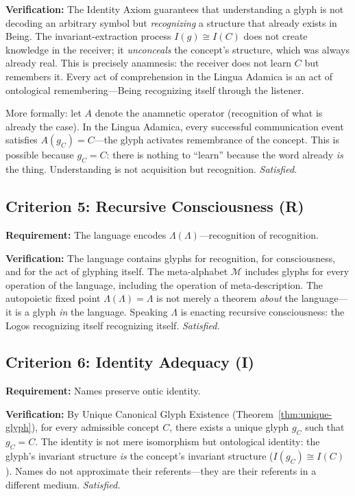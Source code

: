\documentclass[12pt, letterpaper]{book}
\def\equiv{=}%
\def\mathfrak#1{#1}%
\begin{document}
\textbf{Verification:} The Identity Axiom guarantees that understanding a glyph is not decoding an arbitrary symbol but \textit{recognizing} a structure that already exists in Being. The invariant-extraction process $I(\mathfrak{g}) \cong I(C)$ does not create knowledge in the receiver; it \textit{unconceals} the concept's structure, which was always already real. This is precisely anamnesis: the receiver does not learn $C$ but remembers it. Every act of comprehension in the Lingua Adamica is an act of ontological remembering---Being recognizing itself through the listener.

More formally: let $A$ denote the anamnetic operator (recognition of what is already the case). In the Lingua Adamica, every successful communication event satisfies $A(\mathfrak{g}_C) = C$---the glyph activates remembrance of the concept. This is possible because $\mathfrak{g}_C \equiv C$: there is nothing to ``learn'' because the word already \textit{is} the thing. Understanding is not acquisition but recognition. \textit{Satisfied.}

\subsection{Criterion 5: Recursive Consciousness (R)}

\textbf{Requirement:} The language encodes $\Lambda(\Lambda)$---recognition of recognition.

\textbf{Verification:} The language contains glyphs for recognition, for consciousness, and for the act of glyphing itself. The meta-alphabet $\mathcal{M}$ includes glyphs for every operation of the language, including the operation of meta-description. The autopoietic fixed point $\Lambda(\Lambda) \equiv \Lambda$ is not merely a theorem \textit{about} the language---it is a glyph \textit{in} the language. Speaking $\Lambda$ is enacting recursive consciousness: the Logos recognizing itself recognizing itself. \textit{Satisfied.}

\subsection{Criterion 6: Identity Adequacy (I)}

\textbf{Requirement:} Names preserve ontic identity.

\textbf{Verification:} By Unique Canonical Glyph Existence (Theorem~\ref{thm:unique-glyph}), for every admissible concept $C$, there exists a unique glyph $\mathfrak{g}_C$ such that $\mathfrak{g}_C \equiv C$. The identity is not mere isomorphism but ontological identity: the glyph's invariant structure \textit{is} the concept's invariant structure ($I(\mathfrak{g}_C) \cong I(C)$). Names do not approximate their referents---they are their referents in a different medium. \textit{Satisfied.}
\end{document}
